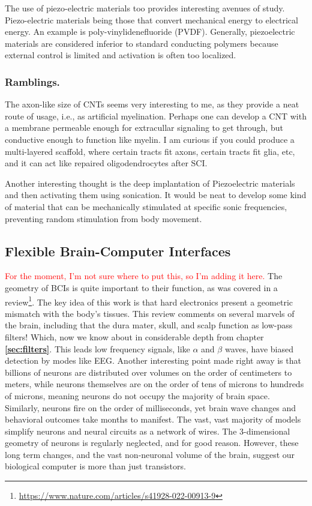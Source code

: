 The use of piezo-electric materials too provides interesting avenues of study. Piezo-electric materials being those that convert mechanical energy to electrical energy. An example is poly-vinylidenefluoride (PVDF). Generally, piezoelectric materials are considered inferior to standard conducting polymers because external control is limited and activation is often too localized. 

\subsubsection{Ramblings.}
The axon-like size of CNTs seems very interesting to me, as they provide a neat route of usage, i.e., as artificial myelination. Perhaps one can develop a CNT with a membrane permeable enough for extracullar signaling to get through, but conductive enough to function like myelin. I am curious if you could produce a multi-layered scaffold, where certain tracts fit axons, certain tracts fit glia, etc, and it can act like repaired oligodendrocytes after SCI.\newline

Another interesting thought is the deep implantation of Piezoelectric materials and then activating them using sonication. It would be neat to develop some kind of material that can be mechanically stimulated at specific sonic frequencies, preventing random stimulation from body movement. 

\subsection{Flexible Brain-Computer Interfaces}

\textcolor{red}{For the moment, I'm not sure where to put this, so I'm adding it here.} The geometry of BCIs is quite important to their function, as was covered in a review\footnote{\url{https://www.nature.com/articles/s41928-022-00913-9}}. The key idea of this work is that hard electronics present a geometric mismatch with the body's tissues. This review comments on several marvels of the brain, including that the dura mater, skull, and scalp function as low-pass filters! Which, now we know about in considerable depth from chapter \textbf{\ref{sec:filters}}. This leads low frequency signals, like $\alpha$ and $\beta$ waves, have biased detection by modes like EEG. Another interesting point made right away is that billions of neurons are distributed over volumes on the order of centimeters to meters, while neurons themselves are on the order of tens of microns to hundreds of microns, meaning neurons do not occupy the majority of brain space. Similarly, neurons fire on the order of milliseconds, yet brain wave changes and behavioral outcomes take months to manifest. The vast, vast majority of models simplify neurons and neural circuits as a network of wires. The 3-dimensional geometry of neurons is regularly neglected, and for good reason. However, these long term changes, and the vast non-neuronal volume of the brain, suggest our biological computer is more than just transistors.\newline

